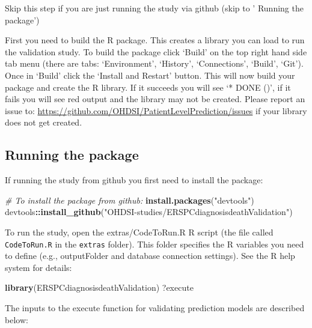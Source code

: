 \documentclass[
]{article}
\newenvironment{Shaded}{\begin{snugshade}}{\end{snugshade}}
\newcommand{\CommentTok}[1]{\textcolor[rgb]{0.56,0.35,0.01}{\textit{#1}}}
\newcommand{\KeywordTok}[1]{\textcolor[rgb]{0.13,0.29,0.53}{\textbf{#1}}}
\newcommand{\NormalTok}[1]{#1}
\newcommand{\OperatorTok}[1]{\textcolor[rgb]{0.81,0.36,0.00}{\textbf{#1}}}
\newcommand{\StringTok}[1]{\textcolor[rgb]{0.31,0.60,0.02}{#1}}
\begin{document}
Skip this step if you are just running the study via github (skip to '
Running the package')

First you need to build the R package. This creates a library you can
load to run the validation study. To build the package click `Build' on
the top right hand side tab menu (there are tabs: `Environment',
`History', `Connections', `Build', `Git'). Once in `Build' click the
`Install and Restart' button. This will now build your package and
create the R library. If it succeeds you will see `* DONE ()', if it
fails you will see red output and the library may not be created. Please
report an issue to:
\url{https://github.com/OHDSI/PatientLevelPrediction/issues} if your
library does not get created.

\hypertarget{running-the-package}{%
\subsection{Running the package}\label{running-the-package}}

If running the study from github you first need to install the package:

\begin{Shaded}
\begin{Highlighting}[]
\CommentTok{# To install the package from github:}
\KeywordTok{install.packages}\NormalTok{(}\StringTok{"devtools"}\NormalTok{)}
\NormalTok{devtools}\OperatorTok{::}\KeywordTok{install_github}\NormalTok{(}\StringTok{"OHDSI-studies/ERSPCdiagnosisdeathValidation"}\NormalTok{)}
\end{Highlighting}
\end{Shaded}

To run the study, open the extras/CodeToRun.R R script (the file called
\texttt{CodeToRun.R} in the \texttt{extras} folder). This folder
specifies the R variables you need to define (e.g., outputFolder and
database connection settings). See the R help system for details:

\begin{Shaded}
\begin{Highlighting}[]
\KeywordTok{library}\NormalTok{(ERSPCdiagnosisdeathValidation)}
\NormalTok{?execute}
\end{Highlighting}
\end{Shaded}

The inputs to the execute function for validating prediction models are
described below:
\end{document}
